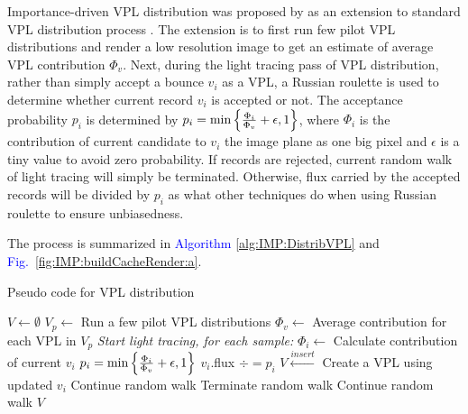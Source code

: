 \documentclass[]{book}
\renewcommand{\figurename}{\textcolor{blue}{Fig.\ }}
\begin{document}
Importance-driven VPL distribution was proposed by \citeauthor{georgiev2010simple} as an extension to standard VPL distribution process \cite{georgiev2010simple}.
The extension is to first run few pilot VPL distributions and render a low resolution image to get an estimate of average VPL contribution $\Phi_v$.
Next, during the light tracing pass of VPL distribution, rather than simply accept a bounce $v_i$ as a VPL, a Russian roulette is used to determine whether current record $v_i$ is accepted or not.
The acceptance probability $p_i$ is determined by $p_i = \textup{min}\left\{ \frac{\Phi_i}{\Phi_v} + \epsilon, 1 \right\}$, where $\Phi_i$ is the contribution of current candidate to $v_i$ the image plane as one big pixel and $\epsilon$ is a tiny value to avoid zero probability.
If records are rejected, current random walk of light tracing will simply be terminated.
Otherwise, flux carried by the accepted records will be divided by $p_i$ as what other techniques do when using Russian roulette to ensure unbiasedness.

The process is summarized in \textcolor{blue}{Algorithm} \ref{alg:IMP:DistribVPL} and \figurename \ref{fig:IMP:buildCacheRender:a}.

\begin{algorithm}[t]
	\caption[VPL Distribution]{Pseudo code for VPL distribution}
	\label{alg:IMP:DistribVPL}
	\begin{algorithmic}[1]
			\State $V \gets \emptyset$
			\State $V_p \gets$ Run a few pilot VPL distributions
			\State $\Phi_v \gets$ Average contribution for each VPL in $V_p$
			\State \textit{Start light tracing, for each sample:}
					\State $\Phi_i \gets$ Calculate contribution of current $v_i$
					\State $p_i = \textup{min}\left\{ \frac{\Phi_i}{\Phi_v} + \epsilon, 1 \right\}$
						\State $v_i$.flux $\mathrel{{\div}{=}} p_i$
						\State $V \xleftarrow{insert}$ Create a VPL using updated $v_i$
						\State Continue random walk
					\Else
						\State Terminate random walk
					\EndIf
				\Else
					\State Continue random walk
				\EndIf
			\EndWhile
			\State \Return $V$
		\EndProcedure
	\end{algorithmic}
\end{algorithm}
\end{document}
